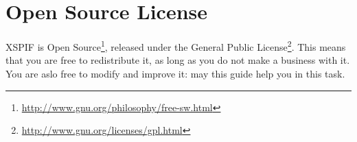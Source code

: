 \section{Open Source License}

\noindent XSPIF is Open Source\footnote{\url{http://www.gnu.org/philosophy/free-sw.html}}, 
released under the General Public 
License\footnote{\url{http://www.gnu.org/licenses/gpl.html}}. This means 
that you are free to redistribute it, as long as you do not make a business 
with it. You are aslo free to modify and improve it: may this guide help you in this task.

